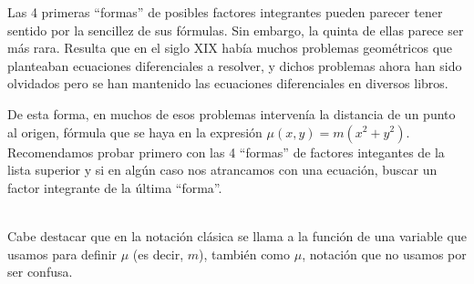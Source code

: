 \begin{observacion}
    Las 4 primeras ``formas'' de posibles factores integrantes pueden parecer tener sentido por la sencillez de sus fórmulas. Sin embargo, la quinta de ellas parece ser más rara. Resulta que en el siglo XIX había muchos problemas geométricos que planteaban ecuaciones diferenciales a resolver, y dichos problemas ahora han sido olvidados pero se han mantenido las ecuaciones diferenciales en diversos libros.

    De esta forma, en muchos de esos problemas intervenía la distancia de un punto al origen, fórmula que se haya en la expresión $\mu(x,y)=m(x^2+y^2)$.\\

    Recomendamos probar primero con las 4 ``formas'' de factores integantes de la lista superior y si en algún caso nos atrancamos con una ecuación, buscar un factor integrante de la última ``forma''.
\end{observacion}~\\
Cabe destacar que en la notación clásica se llama a la función de una variable que usamos para definir $\mu$ (es decir, $m$), también como $\mu$, notación que no usamos por ser confusa.


